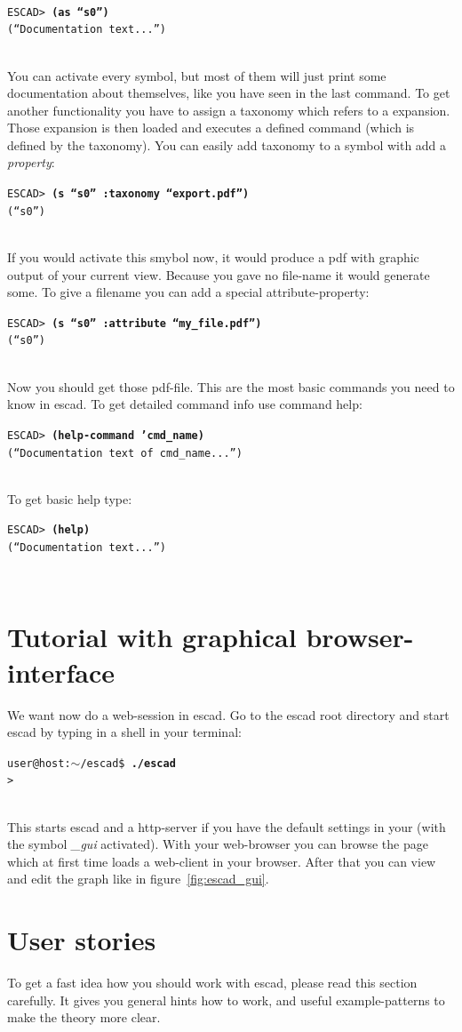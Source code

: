 \documentclass[a4paper, 12pt, openany]{scrbook}
\makeatletter
\newcommand{\shellcmdline}[2]{\\
  \setlength{\fboxsep}{2pt}\colorbox{black!20}{\parbox{\textwidth}{\texttt{user@host:$\sim$/escad\$ \textbf{#1}\\#2}}}\\}
\newcommand{\escadcmdline}[2]{\\\setlength{\fboxsep}{2pt}\colorbox{black!20}{\parbox{\textwidth}{\texttt{ESCAD> \textbf{#1}\\#2}}}\\}
\makeatother
\begin{document}
\escadcmdline{(as ``s0'')}{(``Documentation text...'')}
You can activate every symbol, but most of them will just print some documentation about themselves, like you have seen in the last command. To get another functionality you have to assign a taxonomy which refers to a expansion. Those expansion is then loaded and executes a defined command (which is defined by the taxonomy).
You can easily add taxonomy to a symbol with add a \emph{property}:
\escadcmdline{(s ``s0'' :taxonomy ``export.pdf'')}{(``s0'')}
If you would activate this smybol now, it would produce a pdf with graphic output of your current view. Because you gave no file-name it would generate some. To give a filename you can add a special attribute-property:
\escadcmdline{(s ``s0'' :attribute ``my\_file.pdf'')}{(``s0'')}
Now you should get those pdf-file.
This are the most basic commands you need to know in escad. To get detailed command info use command help:
\escadcmdline{(help-command 'cmd\_name)}{(``Documentation text of cmd\_name...'')}
To get basic help type:
\escadcmdline{(help)}{(``Documentation text...'')}
\section{Tutorial with graphical browser-interface}
We want now do a web-session in escad. Go to the escad root directory and start escad by typing in a shell in your terminal:
\shellcmdline{./escad}{>}
This starts escad and a http-server if you have the default settings in your  (with the symbol \emph{\_gui} activated). With your web-browser you can browse the page which at first time loads a web-client in your browser. After that you can view and edit the graph like in figure~\ref{fig:escad_gui}.
\section{User stories}
To get a fast idea how you should work with escad, please read this section carefully. It gives you general hints how to work, and useful example-patterns to make the theory more clear.
\end{document}
